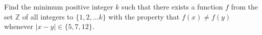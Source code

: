 Find the minimum positive integer $k$ such that there exists a function $f$ from the set $\mathbb{Z}$ of all integers to $\{1, 2, \ldots k\}$ with the property that $f(x) \neq f(y)$ whenever $|x-y| \in \{5, 7, 12\}$.